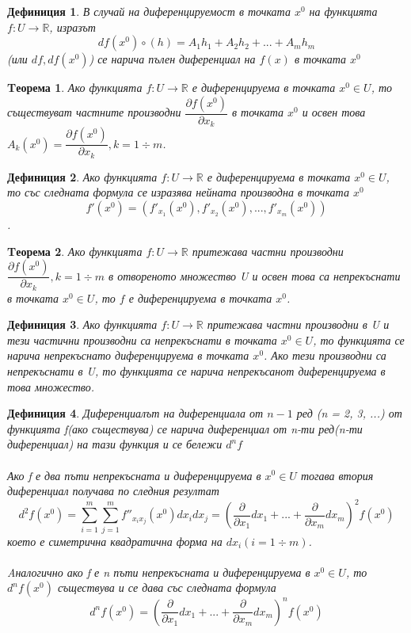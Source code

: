 \documentclass[a4paper,fleqn,12pt]{article}
\newtheorem{theorem}{Tеорема}[subsection]
\newtheorem{definition}{Дефиниция}[subsection]
\begin{document}
\begin{definition}
В случай на диференцируемост в точката $x^0$ на функцията $f: U \to \mathbb{R}$, изразът 
$$df(x^0) \circ (h) = A_1 h_1 + A_2 h_2 + ... + A_m h_m$$
(или $df, df(x^0)$) се нарича пълен диференциал на $f(x)$ в точката $x^0$
\end{definition}

\begin{theorem}
Ако функцията $f: U \to \mathbb{R}$ е диференцируема в точката $x^0 \in U$, то съществуват частните производни $\dfrac{\partial f(x^0)}{\partial x_k}$ в точката $x^0$ и освен това $A_k(x^0) = \dfrac{\partial f(x^0)}{\partial x_k}, k = 1 \div m$.
\end{theorem}

\begin{definition}
Ако функцията $f: U \to \mathbb{R}$ е диференцируема в точката $x^0 \in U$, то със следната формула се изразява нейната производна в точката $x^0$
$$f'(x^0) = (f'_{x_1}(x^0), f'_{x_2}(x^0), ..., f'_{x_m}(x^0))$$.

\end{definition}

\begin{theorem}
Ако функцията $f: U \to \mathbb{R}$ притежава частни производни $\dfrac{\partial f(x^0)}{\partial x_k}, k = 1 \div m$ в отвореното множество U и освен това са непрекъснати в точката $x^0 \in U$, то $f$ е диференцируема в точката $x^0$.
\end{theorem}

\begin{definition}
Ако функцията $f: U \to \mathbb{R}$ притежава частни производни в U и тези частични производни са непрекъснати в точката $x^0 \in U$, то функцията се нарича непрекъснато диференцируема в точката $x^0$. Ако тези производни са непрекъснати в U, то функцията се нарича непрекъсанот диференцируема в това множество. 
\end{definition}

\begin{definition}
Диференциалът на диференциала от $n-1$ ред (n = 2, 3, ...) от функцията f(ако съществува) се нарича диференциал от n-ти ред(n-ти диференциал) на тази функция и се бележи $d^n f$\\
\\
Ако f е два пъти непрекъсната и диференцируема в $x^0 \in U$ тогава втория диференциал получава по следния резултат
$$d^2 f(x^0) = \sum_{i=1}^ m \sum_{j=1}^m f''_{x_i x_j}(x^0) dx_i dx_j = \left( \dfrac{\partial}{\partial x_1}dx_1 + ... + \dfrac{\partial}{\partial x_m}dx_m\right )^2 f(x^0)$$
което е симетрична квадратична форма на $dx_i (i = 1 \div m)$. \\
\\
Aналогично ако f е n пъти непрекъсната и диференцируема в $x^0 \in U$, то $d^n f(x^0)$ съществува и се дава със следната формула 
$$d^n f(x^0) = \left( \dfrac{\partial}{\partial x_1}dx_1 + ... + \dfrac{\partial}{\partial x_m}dx_m\right )^n f(x^0)$$
\end{definition}
\end{document}
